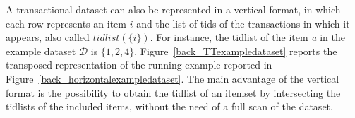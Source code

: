 A transactional dataset can also be represented in a vertical format, in which each
row represents an item $i$ and the list of tids of the transactions in which it appears,
also called $tidlist(\{i\})$.
For instance, the tidlist of the item \textit{a} in
the example dataset $\mathcal{D}$ is $\{1,2,4\}$.
Figure~\ref{back_TTexampledataset} reports the transposed representation of the
running example reported in Figure~\ref{back_horizontalexampledataset}. The main
advantage of the vertical format is the possibility to obtain the tidlist of
an itemset by intersecting the tidlists of the included items, without the
need of a full scan of the dataset.






